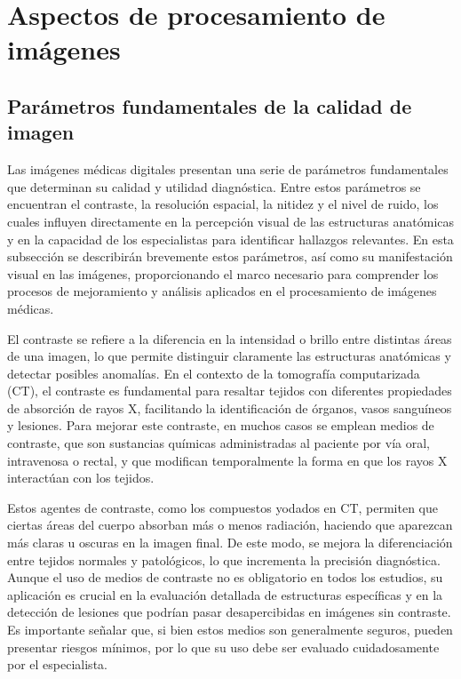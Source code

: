 \section{Aspectos de procesamiento de imágenes}

\subsection{Parámetros fundamentales de la calidad de imagen}

Las imágenes médicas digitales presentan una serie de parámetros fundamentales que determinan su calidad y utilidad diagnóstica. Entre estos parámetros se encuentran el contraste, la resolución espacial, la nitidez y el nivel de ruido, los cuales influyen directamente en la percepción visual de las estructuras anatómicas y en la capacidad de los especialistas para identificar hallazgos relevantes. En esta subsección se describirán brevemente estos parámetros, así como su manifestación visual en las imágenes, proporcionando el marco necesario para comprender los procesos de mejoramiento y análisis aplicados en el procesamiento de imágenes médicas\cite{ImageProcessingBook}.

El contraste se refiere a la diferencia en la intensidad o brillo entre distintas áreas de una imagen, lo que permite distinguir claramente las estructuras anatómicas y detectar posibles anomalías. En el contexto de la tomografía computarizada (CT), el contraste es fundamental para resaltar tejidos con diferentes propiedades de absorción de rayos X, facilitando la identificación de órganos, vasos sanguíneos y lesiones. Para mejorar este contraste, en muchos casos se emplean medios de contraste, que son sustancias químicas administradas al paciente por vía oral, intravenosa o rectal, y que modifican temporalmente la forma en que los rayos X interactúan con los tejidos.

Estos agentes de contraste, como los compuestos yodados en CT, permiten que ciertas áreas del cuerpo absorban más o menos radiación, haciendo que aparezcan más claras u oscuras en la imagen final. De este modo, se mejora la diferenciación entre tejidos normales y patológicos, lo que incrementa la precisión diagnóstica. Aunque el uso de medios de contraste no es obligatorio en todos los estudios, su aplicación es crucial en la evaluación detallada de estructuras específicas y en la detección de lesiones que podrían pasar desapercibidas en imágenes sin contraste. Es importante señalar que, si bien estos medios son generalmente seguros, pueden presentar riesgos mínimos, por lo que su uso debe ser evaluado cuidadosamente por el especialista.

